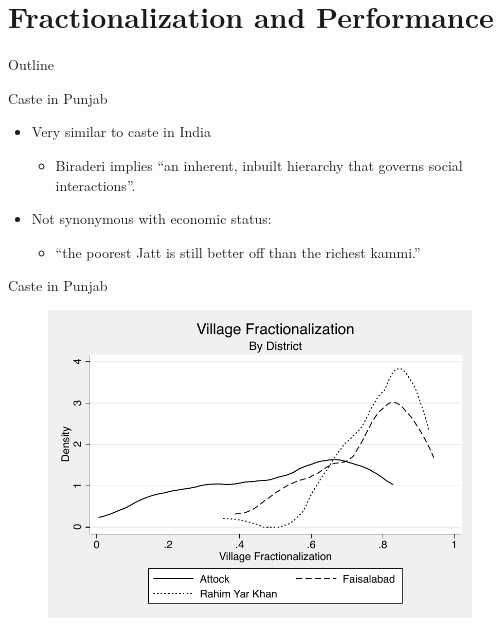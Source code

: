 \documentclass[handout]{beamer}
\begin{document}
\section{Fractionalization and Performance}\label{}
\begin{frame}{Outline}
	\tableofcontents[currentsection]
\end{frame}

\begin{frame}{Caste in Punjab}
\begin{itemize}
	\item Very similar to caste in India
	\begin{itemize}
		\item Biraderi implies ``an inherent, inbuilt hierarchy that governs social interactions''\citep[p. 29]{Gazdar:2007vt}.	
	\end{itemize}
	\item Not synonymous with economic status:
	\begin{itemize}
		\item ``the poorest Jatt is still better off than the richest kammi.'' \citep[p. 13]{Gazdar:2007vt} 
	\end{itemize}
\end{itemize}
\end{frame}
	
\begin{frame}{Caste in Punjab}
	\begin{figure}[htb]
		\begin{center}
		\label{fracdensities}
		\includegraphics[scale=0.6]{graphs/village_frac_by_district.pdf}
		\end{center}
	\end{figure}		
\end{frame}
\end{document}
